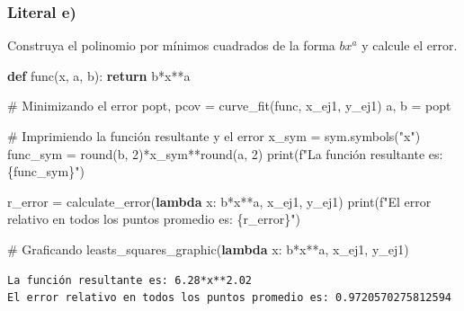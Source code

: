 \documentclass[
  letterpaper,
  DIV=11,
  numbers=noendperiod]{scrartcl}
\newenvironment{Shaded}{\begin{snugshade}}{\end{snugshade}}
\newcommand{\BuiltInTok}[1]{\textcolor[rgb]{0.00,0.23,0.31}{#1}}
\newcommand{\CommentTok}[1]{\textcolor[rgb]{0.37,0.37,0.37}{#1}}
\newcommand{\ControlFlowTok}[1]{\textcolor[rgb]{0.00,0.23,0.31}{\textbf{#1}}}
\newcommand{\DecValTok}[1]{\textcolor[rgb]{0.68,0.00,0.00}{#1}}
\newcommand{\KeywordTok}[1]{\textcolor[rgb]{0.00,0.23,0.31}{\textbf{#1}}}
\newcommand{\NormalTok}[1]{\textcolor[rgb]{0.00,0.23,0.31}{#1}}
\newcommand{\OperatorTok}[1]{\textcolor[rgb]{0.37,0.37,0.37}{#1}}
\newcommand{\SpecialCharTok}[1]{\textcolor[rgb]{0.37,0.37,0.37}{#1}}
\newcommand{\SpecialStringTok}[1]{\textcolor[rgb]{0.13,0.47,0.30}{#1}}
\newcommand{\StringTok}[1]{\textcolor[rgb]{0.13,0.47,0.30}{#1}}
\begin{document}
\subsubsection{Literal e)}\label{literal-e}

Construya el polinomio por mínimos cuadrados de la forma \(bx^a\) y
calcule el error.

\begin{Shaded}
\begin{Highlighting}[]

\KeywordTok{def}\NormalTok{ func(x, a, b):}
    \ControlFlowTok{return}\NormalTok{ b}\OperatorTok{*}\NormalTok{x}\OperatorTok{**}\NormalTok{a}

\CommentTok{\# Minimizando el error}
\NormalTok{popt, pcov }\OperatorTok{=}\NormalTok{ curve\_fit(func, x\_ej1, y\_ej1)}
\NormalTok{a, b }\OperatorTok{=}\NormalTok{ popt}

\CommentTok{\# Imprimiendo la función resultante y el error}
\NormalTok{x\_sym }\OperatorTok{=}\NormalTok{ sym.symbols(}\StringTok{"x"}\NormalTok{)}
\NormalTok{func\_sym }\OperatorTok{=} \BuiltInTok{round}\NormalTok{(b, }\DecValTok{2}\NormalTok{)}\OperatorTok{*}\NormalTok{x\_sym}\OperatorTok{**}\BuiltInTok{round}\NormalTok{(a, }\DecValTok{2}\NormalTok{)}
\BuiltInTok{print}\NormalTok{(}\SpecialStringTok{f"La función resultante es: }\SpecialCharTok{\{}\NormalTok{func\_sym}\SpecialCharTok{\}}\SpecialStringTok{"}\NormalTok{)}

\NormalTok{r\_error }\OperatorTok{=}\NormalTok{ calculate\_error(}\KeywordTok{lambda}\NormalTok{ x: b}\OperatorTok{*}\NormalTok{x}\OperatorTok{**}\NormalTok{a, x\_ej1, y\_ej1)}
\BuiltInTok{print}\NormalTok{(}\SpecialStringTok{f"El error relativo en todos los puntos promedio es: }\SpecialCharTok{\{}\NormalTok{r\_error}\SpecialCharTok{\}}\SpecialStringTok{"}\NormalTok{)}

\CommentTok{\# Graficando}
\NormalTok{leasts\_squares\_graphic(}\KeywordTok{lambda}\NormalTok{ x: b}\OperatorTok{*}\NormalTok{x}\OperatorTok{**}\NormalTok{a, x\_ej1, y\_ej1)}
\end{Highlighting}
\end{Shaded}

\begin{verbatim}
La función resultante es: 6.28*x**2.02
El error relativo en todos los puntos promedio es: 0.9720570275812594
\end{verbatim}
\end{document}
